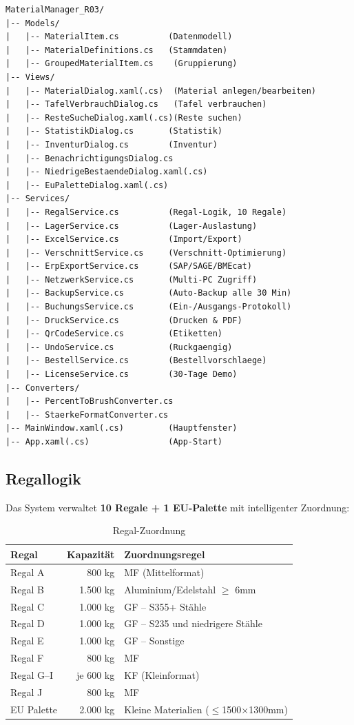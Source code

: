\documentclass[a4paper,12pt]{article}
\begin{document}
\begin{lstlisting}[language={},title=Projektstruktur]
MaterialManager_R03/
|-- Models/
|   |-- MaterialItem.cs          (Datenmodell)
|   |-- MaterialDefinitions.cs   (Stammdaten)
|   |-- GroupedMaterialItem.cs    (Gruppierung)
|-- Views/
|   |-- MaterialDialog.xaml(.cs)  (Material anlegen/bearbeiten)
|   |-- TafelVerbrauchDialog.cs   (Tafel verbrauchen)
|   |-- ResteSucheDialog.xaml(.cs)(Reste suchen)
|   |-- StatistikDialog.cs       (Statistik)
|   |-- InventurDialog.cs        (Inventur)
|   |-- BenachrichtigungsDialog.cs
|   |-- NiedrigeBestaendeDialog.xaml(.cs)
|   |-- EuPaletteDialog.xaml(.cs)
|-- Services/
|   |-- RegalService.cs          (Regal-Logik, 10 Regale)
|   |-- LagerService.cs          (Lager-Auslastung)
|   |-- ExcelService.cs          (Import/Export)
|   |-- VerschnittService.cs     (Verschnitt-Optimierung)
|   |-- ErpExportService.cs      (SAP/SAGE/BMEcat)
|   |-- NetzwerkService.cs       (Multi-PC Zugriff)
|   |-- BackupService.cs         (Auto-Backup alle 30 Min)
|   |-- BuchungsService.cs       (Ein-/Ausgangs-Protokoll)
|   |-- DruckService.cs          (Drucken & PDF)
|   |-- QrCodeService.cs         (Etiketten)
|   |-- UndoService.cs           (Ruckgaengig)
|   |-- BestellService.cs        (Bestellvorschlaege)
|   |-- LicenseService.cs        (30-Tage Demo)
|-- Converters/
|   |-- PercentToBrushConverter.cs
|   |-- StaerkeFormatConverter.cs
|-- MainWindow.xaml(.cs)         (Hauptfenster)
|-- App.xaml(.cs)                (App-Start)
\end{lstlisting}

\subsection{Regallogik}

Das System verwaltet \textbf{10 Regale + 1 EU-Palette} mit intelligenter Zuordnung:

\begin{table}[h]
\centering
\begin{tabularx}{\textwidth}{l r X}
\toprule
\textbf{Regal} & \textbf{Kapazität} & \textbf{Zuordnungsregel} \\
\midrule
Regal A & 800 kg & MF (Mittelformat) \\
Regal B & 1.500 kg & Aluminium/Edelstahl $\geq$ 6mm \\
Regal C & 1.000 kg & GF -- S355+ Stähle \\
Regal D & 1.000 kg & GF -- S235 und niedrigere Stähle \\
Regal E & 1.000 kg & GF -- Sonstige \\
Regal F & 800 kg & MF \\
Regal G--I & je 600 kg & KF (Kleinformat) \\
Regal J & 800 kg & MF \\
EU Palette & 2.000 kg & Kleine Materialien ($\leq$1500$\times$1300mm) \\
\bottomrule
\end{tabularx}
\caption{Regal-Zuordnung}
\end{table}
\end{document}
